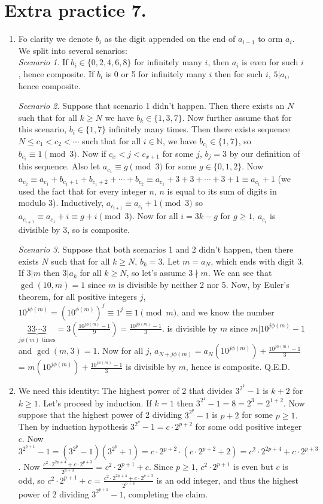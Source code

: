 \documentclass[11pt]{article}
\begin{document}
\section {Extra practice 7.}
\begin{enumerate}
\item Fo clarity we denote $b_i$ as the digit appended on the end of $a_{i-1}$ to orm $a_i$. We split into several senarios:\\
\emph{Scenario 1.} If $b_i\in\{0,2,4,6,8\}$ for infinitely many $i$, then $a_i$ is even for such $i$, hence composite. If $b_i$ is 0 or 5 for infinitely many $i$ then for such $i$, $5|a_i$, hence composite.

\emph {Scenario 2.} Suppose that scenario 1 didn't happen. Then there exists an $N$ such that for all $k\ge N$ we have $b_k\in\{1,3,7\}$. Now further assume that for this scenario, $b_i\in\{1,7\}$ infinitely many times. Then there exists sequence $N\le c_1<c_2<\cdots$ such that for all $i\in\mathbb{N}$, we have $b_{c_i}\in\{1,7\}$, so $b_{c_i}\equiv 1\pmod {3}$. Now if $c_x<j<c_{x+1}$ for some $j$, $b_j=3$ by our definition of this sequence. Also let $a_{c_1}\equiv g\pmod {3}$ for some $g\in\{0,1,2\}$. Now $a_{c_2}\equiv a_{c_1}+b_{c_1+1}+b_{c_1+2}+\cdots + b_{c_2}\equiv a_{c_1}+3+3+\cdots +3+1\equiv a_{c_1}+1$ (we used the fact that for every integer $n$, $n$ is equal to its sum of digits in modulo 3). Inductively, $a_{c_{i+1}}\equiv a_{c_i}+1\pmod{3}$ so $a_{c_{i+1}}\equiv a_{c_1}+i\equiv g+i\pmod {3}.$ Now for all $i=3k-g$ for $g\ge 1$, $a_{c_i}$ is divisible by 3, so is composite.

\emph {Scenario 3.} Suppose that both scenarios 1 and 2 didn't happen, then there exists $N$ such that for all $k\ge N$, $b_k=3$. Let $m=a_N$, which ends with digit 3. If $3|m$ then $3|a_k$ for all $k\ge N$, so let's assume $3\nmid m$. We can see that $\gcd (10, m)=1$ since $m$ is divisible by neither 2 nor 5. Now, by Euler's theorem, for all positive integers $j$, $10^{j\phi(m)}=(10^{\phi (m)})^j\equiv 1^j\equiv 1\pmod {m}$, and we know the number $\underbrace{33\cdots 3}_{j\phi(m)\text{ times}}=3(\frac{10^{j\phi(m)}-1}{9})=\frac{10^{j\phi(m)}-1}{3}.$  is divisible by $m$ since $m|10^{j\phi(m)}-1$ and $\gcd (m,3)=1$. Now for all $j$, $a_{N+j\phi(m)}=a_N(10^{j\phi(m)})+\frac{10^{j\phi(m)}-1}{3}$ = $m(10^{j\phi(m)})+\frac{10^{j\phi(m)}-1}{3}$ is divisible by $m$, hence is composite. Q.E.D.

\item We need this identity: The highest power of 2 that divides $3^{2^k}-1$ is $k+2$ for $k\ge 1$. Let's proceed by induction. If $k=1$ then $3^{2^1}-1=8=2^3=2^{1+2}$. Now suppose that the highest power of 2 dividing $3^{2^p}-1$ is $p+2$ for some $p\ge 1.$ Then by induction hypothesis $3^{2^p}-1=c\cdot 2^{p+2}$ for some odd positive integer $c$. Now $3^{2^{p+1}}-1=(3^{2^p}-1)(3^{2^p}+1)=c\cdot 2^{p+2}\cdot(c\cdot 2^{p+2}+2) = c^2\cdot 2^{2p+4}+ c\cdot 2^{p+3}$. Now $\frac{c^2\cdot 2^{2p+4}+ c\cdot 2^{p+3}}{2^{p+3}}$ = $c^2\cdot 2^{p+1}+c.$ Since $p\ge 1$, $c^2\cdot 2^{p+1}$ is even but $c$ is odd, so $c^2\cdot 2^{p+1}+c$ = $\frac{c^2\cdot 2^{2p+4}+ c\cdot 2^{p+3}}{2^{p+3}}$ is an odd integer, and thus the highest power of 2 dividing $3^{2^{p+1}}-1$, completing the claim.


\end{enumerate}
\end{document}
